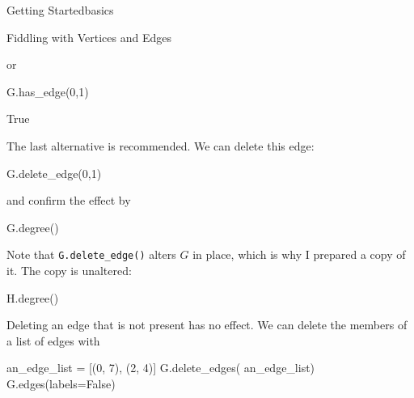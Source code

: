 \begin{chap}{Getting Started}{basics}
\begin{sect}{Fiddling with Vertices and Edges}
\begin{sagecode}
\end{sagecode}
%
\begin{para}
or
\end{para}
%
\begin{sagecode}
\begin{sageinput}
G.has_edge(0,1)
\end{sageinput}
\begin{sageoutput}
True
\end{sageoutput}
\end{sagecode}
%
\begin{para}
The last alternative is recommended.
We can delete this edge:
\end{para}
%
\begin{sagecode}
\begin{sageinput}
G.delete_edge(0,1)
\end{sageinput}
\begin{sageoutput}
\end{sageoutput}
\end{sagecode}
%
\begin{para}
and confirm the effect by
\end{para}
%
\begin{sagecode}
\begin{sageinput}
G.degree()
\end{sageinput}
\begin{sageoutput}
[3, 3, 4, 4, 4, 4, 4, 4, 4]
\end{sageoutput}
\end{sagecode}
%
\begin{para}
Note that \verb|G.delete_edge()| alters $G$ in place, which is why I
prepared a copy of it. The copy is unaltered:
\end{para}
%
\begin{sagecode}
\begin{sageinput}
H.degree()
\end{sageinput}
\begin{sageoutput}
[4, 4, 4, 4, 4, 4, 4, 4, 4]
\end{sageoutput}
\end{sagecode}
%
\begin{para}
Deleting an edge that is not present has no effect. We can delete
the members of a list of edges with 
\end{para}
%
\begin{sagecode}
\begin{sageinput}
an_edge_list = [(0, 7), (2, 4)]
G.delete_edges( an_edge_list)
G.edges(labels=False)
\end{sageinput}

\end{sagecode}
\end{sect}
\end{chap}
